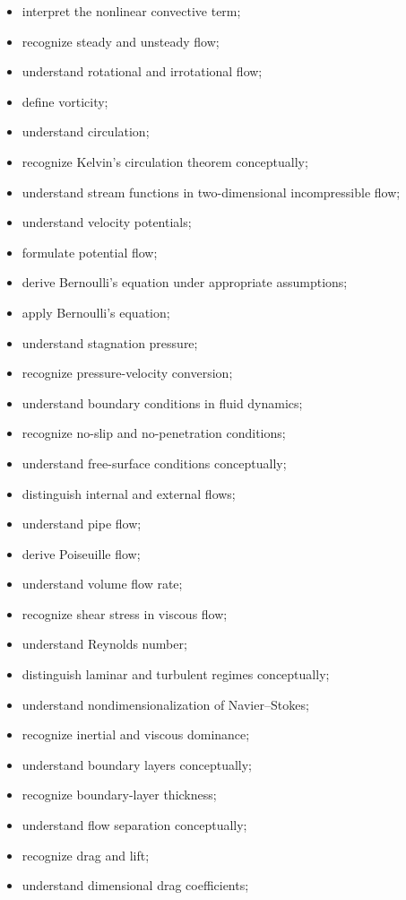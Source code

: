 {\begin{itemize}
    \item interpret the nonlinear convective term;
    \item recognize steady and unsteady flow;
    \item understand rotational and irrotational flow;
    \item define vorticity;
    \item understand circulation;
    \item recognize Kelvin's circulation theorem conceptually;
    \item understand stream functions in two-dimensional incompressible flow;
    \item understand velocity potentials;
    \item formulate potential flow;
    \item derive Bernoulli's equation under appropriate assumptions;
    \item apply Bernoulli's equation;
    \item understand stagnation pressure;
    \item recognize pressure-velocity conversion;
    \item understand boundary conditions in fluid dynamics;
    \item recognize no-slip and no-penetration conditions;
    \item understand free-surface conditions conceptually;
    \item distinguish internal and external flows;
    \item understand pipe flow;
    \item derive Poiseuille flow;
    \item understand volume flow rate;
    \item recognize shear stress in viscous flow;
    \item understand Reynolds number;
    \item distinguish laminar and turbulent regimes conceptually;
    \item understand nondimensionalization of Navier--Stokes;
    \item recognize inertial and viscous dominance;
    \item understand boundary layers conceptually;
    \item recognize boundary-layer thickness;
    \item understand flow separation conceptually;
    \item recognize drag and lift;
    \item understand dimensional drag coefficients;

\end{itemize}}
